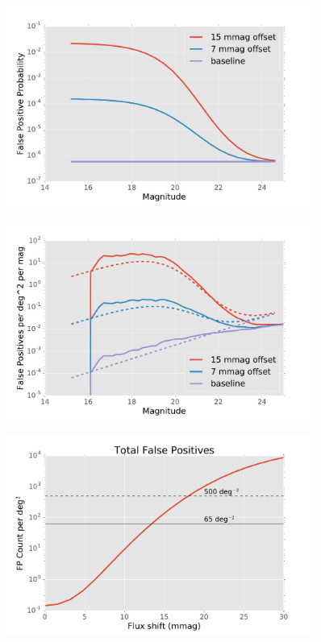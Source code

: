 \documentclass[12pt]{article}
\begin{document}
\begin{figure}
\includegraphics[width=0.9\textwidth]{figures/false_positive_prob.pdf}
\caption{\label{fig:false_positive_prob}}
\end{figure}

\begin{figure}
\includegraphics[width=0.9\textwidth]{figures/false_positive_differential.pdf}
\caption{\label{fig:false_positive_differential}}
\end{figure}

\begin{figure}
\includegraphics[width=0.9\textwidth]{figures/fp_vs_flux_shift.pdf}
\caption{\label{fig:fp_vs_flux_shift}}
\end{figure}
\end{document}
